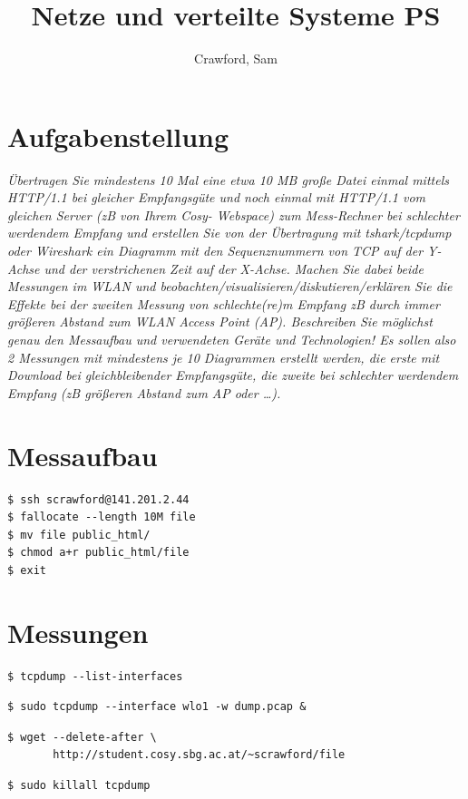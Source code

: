 \documentclass[
    pdftex,
    12pt,
    parskip=half,
    a4paper
]{scrartcl}
\author{Crawford, Sam}
\title{Netze und verteilte Systeme PS}
\begin{document}
\section{Aufgabenstellung}
\textit{Übertragen Sie mindestens 10 Mal eine etwa 10 MB große Datei einmal mittels HTTP/1.1 bei
gleicher Empfangsgüte und noch einmal mit HTTP/1.1 vom gleichen Server (zB von Ihrem Cosy-
Webspace) zum Mess-Rechner bei schlechter werdendem Empfang und erstellen Sie von der
Übertragung mit tshark/tcpdump oder Wireshark ein Diagramm mit den Sequenznummern von TCP
auf der Y-Achse und der verstrichenen Zeit auf der X-Achse. Machen Sie dabei beide Messungen
im WLAN und beobachten/visualisieren/diskutieren/erklären Sie die Effekte bei der zweiten
Messung von schlechte(re)m Empfang zB durch immer größeren Abstand zum WLAN Access Point
(AP).
Beschreiben Sie möglichst genau den Messaufbau und verwendeten Geräte und Technologien!
Es sollen also 2 Messungen mit mindestens je 10 Diagrammen erstellt werden, die erste mit
Download bei gleichbleibender Empfangsgüte, die zweite bei schlechter werdendem Empfang (zB
größeren Abstand zum AP oder …).}

\section{Messaufbau}
\vspace{3cm}%

\begin{lstlisting}
$ ssh scrawford@141.201.2.44
$ fallocate --length 10M file
$ mv file public_html/
$ chmod a+r public_html/file
$ exit
\end{lstlisting}

\vspace{1cm}%

\section{Messungen}


\vspace{2cm}%
\begin{lstlisting}
$ tcpdump --list-interfaces
\end{lstlisting}
\vspace{2cm}%

\begin{lstlisting}
$ sudo tcpdump --interface wlo1 -w dump.pcap &
\end{lstlisting}
\vspace{2cm}%
\begin{lstlisting}
$ wget --delete-after \
       http://student.cosy.sbg.ac.at/~scrawford/file
\end{lstlisting}
\vspace{2cm}%
\begin{lstlisting}
$ sudo killall tcpdump
\end{lstlisting}
\end{document}
